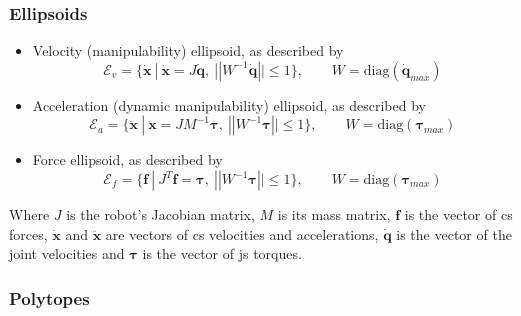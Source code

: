 \subsubsection*{Ellipsoids}
\begin{itemize}
\itemindent=-13pt
\item  Velocity (manipulability) ellipsoid, as described by \citet{yoshikawa_manipulability_1985} 
\begin{equation}\label{eq:ev_r}
\mathcal{E}_{v} = \{\dot{\bm{x}} ~| ~\dot{\bm{x}} = J\dot{\bm{q}},~ ||W^{-1}\dot{\bm{q}}||\leq1 \}, \qquad W = \text{diag}(\dot{\bm{q}}_{max})
\end{equation}
\item  Acceleration (dynamic manipulability) ellipsoid, as described by \citet{chiacchio_new_2000}
\begin{equation}\label{eq:ea_r}
\mathcal{E}_{a} = \{\ddot{\bm{x}} ~| ~\ddot{\bm{x}} = JM^{-1}\bm{\tau},~ ||W^{-1}\bm{\tau}||\leq1 \}, \qquad W = \text{diag}(\bm{\tau}_{max})
\end{equation}
\item  Force ellipsoid, as described by \citet{Chiacchio1997Force}
\begin{equation}\label{eq:ef_r}
\mathcal{E}_{f} = \{\bm{f} ~| ~J^{T}\bm{f} = \bm{\tau},~ ||W^{-1}\bm{\tau}||\leq1 \}, \qquad W = \text{diag}(\bm{\tau}_{max})
\end{equation}
\end{itemize}

Where $J$ is the robot's Jacobian matrix, $M$ is its mass matrix, $\bm{f}$ is the vector of \gls{cs} forces, $\dot{\bm{x}}$ and $\ddot{\bm{x}}$ are vectors of \gls{cs} velocities and accelerations, $\dot{\bm{q}}$ is the vector of the joint velocities and $\bm{\tau}$ is the vector of \gls{js} torques.

\subsubsection*{Polytopes}

